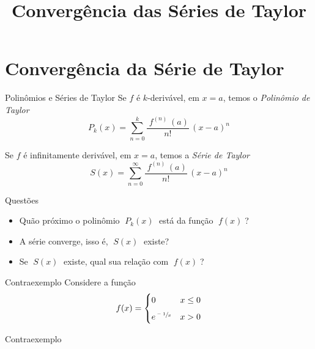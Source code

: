\documentclass[fleqn,utf8,aspectratio=169,12pt]{beamer}
\title{Convergência das Séries de Taylor}
\begin{document}
\addtitle

\section{Convergência da Série de Taylor}

\begin{frame}{Polinômios e Séries de Taylor}
  Se $f$ é $k$-derivável, em \(x=a\), temos o \emph{Polinômio de Taylor}
  \[
    P_k(x) = \sum_{n=0}^k \frac{\;f^{(n)\;}(a)}{n!}\,(x-a)^n
  \]

  \pause
  \vspace{\baselineskip}
  Se $f$ é infinitamente derivável, em \(x=a\), temos a \emph{Série de Taylor}
  \[
    S(x) = \sum_{n=0}^\infty \frac{\;f^{(n)\;}(a)}{n!}\,(x-a)^n
  \]
\end{frame}

\begin{frame}{Questões}
  \begin{itemize}[<+->]
    \item Quão próximo o polinômio $\;P_k(x)\;$ está da função $\;f(x)\;$?
    \vspace{\baselineskip}
    \item A série converge, isso é, $\;S(x)\;$ existe?
    \vspace{\baselineskip}
    \item Se $\;S(x)\;$ existe, qual sua relação com $\;f(x)\;$?
  \end{itemize}
\end{frame}

\begin{frame}{Contraexemplo}
  Considere a função
  \[
    f(x) = \begin{cases}
      0                 & x \leq 0 \\[2mm]
      e^{\sfrac{-1}{x}} & x > 0
    \end{cases}
  \]
\end{frame}

\begin{frame}{Contraexemplo}
  \centering
  \scalebox{0.8}{}
\end{frame}
\end{document}

